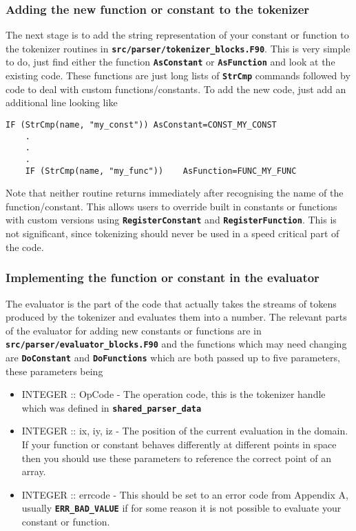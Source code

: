 \documentclass[12pt,a4paper]{article}
\newcommand{\simpleboxverbatim}{\begin{Verbatim}[obeytabs=true,frame=single,
  framerule=0.5mm,rulecolor=\color{warwickmid},formatcom=\color{black}]}
\newcommand{\inlinecode}[1]{{\color{warwickred} \bf\texttt{#1}}}
\begin{document}
\subsubsection{Adding the new function or constant to the tokenizer}
The next stage is to add the string representation of your constant or function
to the tokenizer routines in
\inlinecode{src/parser/tokenizer\_blocks.F90}. This is very simple to do, just
find either the function \inlinecode{AsConstant} or \inlinecode{AsFunction} and
look at the existing code. These functions are just long lists of
\inlinecode{StrCmp} commands followed by code to deal with custom
functions/constants. To add the new code, just add an additional line looking
like
\simpleboxverbatim
    IF (StrCmp(name, "my_const")) AsConstant=CONST_MY_CONST
    .
    .
    .
    IF (StrCmp(name, "my_func"))    AsFunction=FUNC_MY_FUNC
\end{Verbatim}
Note that neither routine returns immediately after recognising the name of the
function/constant. This allows users to override built in constants or
functions with custom versions using \inlinecode{RegisterConstant} and
\inlinecode{RegisterFunction}. This is not significant, since tokenizing should
never be used in a speed critical part of the code.

\subsubsection{Implementing the function or constant in the evaluator}
The evaluator is the part of the code that actually takes the streams of tokens
produced by the tokenizer and evaluates them into a number. The relevant parts
of the evaluator for adding new constants or functions are in
\inlinecode{src/parser/evaluator\_blocks.F90} and the functions which may need
changing are \inlinecode{DoConstant} and \inlinecode{DoFunctions} which are
both passed up to five parameters, these parameters being
\begin{itemize}
\item INTEGER :: OpCode - The operation code, this is the tokenizer handle
  which was defined in \inlinecode{shared\_parser\_data}
\item INTEGER :: ix, iy, iz - The position of the current evaluation in the
  domain. If your function or constant behaves differently at different points
  in space then you should use these parameters to reference the correct point
  of an array.
\item INTEGER :: errcode - This should be set to an error code from Appendix A,
  usually \inlinecode{ERR\_BAD\_VALUE} if for some reason it is not possible to
  evaluate your constant or function.
\end{itemize}
\end{document}
